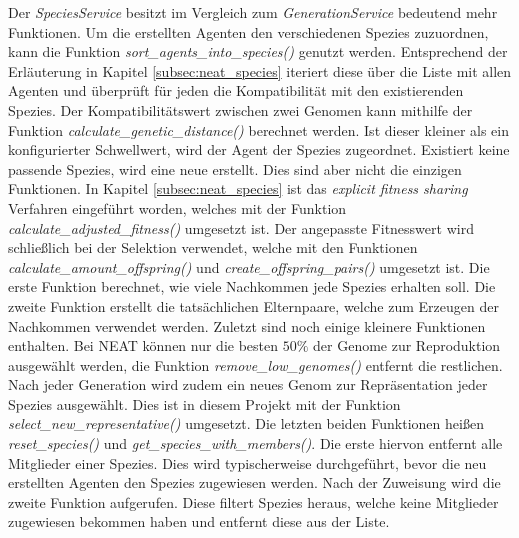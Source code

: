 Der \emph{SpeciesService} besitzt im Vergleich zum \emph{GenerationService} bedeutend mehr Funktionen. Um die erstellten Agenten den verschiedenen Spezies zuzuordnen, kann die Funktion \emph{sort\_agents\_into\_species()} genutzt werden. Entsprechend der Erläuterung in Kapitel \ref{subsec:neat_species} iteriert diese über die Liste mit allen Agenten und überprüft für jeden die Kompatibilität mit den existierenden Spezies. Der Kompatibilitätswert zwischen zwei Genomen kann mithilfe der Funktion \emph{calculate\_genetic\_distance()} berechnet werden. Ist dieser kleiner als ein konfigurierter Schwellwert, wird der Agent der Spezies zugeordnet. Existiert keine passende Spezies, wird eine neue erstellt. Dies sind aber nicht die einzigen Funktionen. In Kapitel \ref{subsec:neat_species} ist das \emph{explicit fitness sharing} Verfahren eingeführt worden, welches mit der Funktion \emph{calculate\_adjusted\_fitness()} umgesetzt ist. Der angepasste Fitnesswert wird schließlich bei der Selektion verwendet, welche mit den Funktionen \emph{calculate\_amount\_offspring()} und \emph{create\_offspring\_pairs()} umgesetzt ist. Die erste Funktion berechnet, wie viele Nachkommen jede Spezies erhalten soll. Die zweite Funktion erstellt die tatsächlichen Elternpaare, welche zum Erzeugen der Nachkommen verwendet werden. Zuletzt sind noch einige kleinere Funktionen enthalten. Bei \ac{NEAT} können nur die besten $50\%$ der Genome zur Reproduktion ausgewählt werden, die Funktion \emph{remove\_low\_genomes()} entfernt die restlichen. Nach jeder Generation wird zudem ein neues Genom zur Repräsentation jeder Spezies ausgewählt. Dies ist in diesem Projekt mit der Funktion \emph{select\_new\_representative()} umgesetzt. Die letzten beiden Funktionen heißen \emph{reset\_species()} und \emph{get\_species\_with\_members()}. Die erste hiervon entfernt alle Mitglieder einer Spezies. Dies wird typischerweise durchgeführt, bevor die neu erstellten Agenten den Spezies zugewiesen werden. Nach der Zuweisung wird die zweite Funktion aufgerufen. Diese filtert Spezies heraus, welche keine Mitglieder zugewiesen bekommen haben und entfernt diese aus der Liste. 

